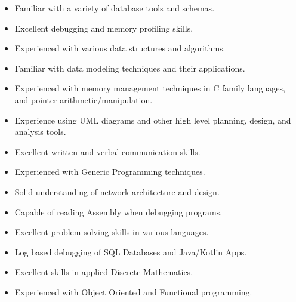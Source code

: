 \documentclass[9pt]{developercv}
\begin{document}
\begin{minipage}[t]{1\textwidth}
    \begin{minipage}[t]{.085\textwidth}
    \end{minipage}
    \hfill
     \begin{minipage}[t]{.4575\textwidth}
           \begin{itemize}[itemsep=2pt,topsep=0pt,parsep=0pt,partopsep=0pt,leftmargin=0pt]
            \item Familiar with a variety of database tools and schemas.
            \item Excellent debugging and memory profiling skills.
             \item Experienced with various data structures and algorithms.
            \item Familiar with data modeling techniques and their applications.

            \item Experienced with memory management techniques in C family languages, and pointer arithmetic/manipulation.
            \item Experience using UML diagrams and other high level planning, design, and analysis tools.
        \end{itemize}
    \end{minipage}
    \hfill
     \begin{minipage}[t]{.48\textwidth}
        \begin{itemize}[itemsep=2pt,topsep=0pt,parsep=0pt,partopsep=0pt,leftmargin=0pt]
            \item Excellent written and verbal communication skills.
            \item Experienced with Generic Programming techniques.
            \item Solid understanding of network architecture and design.
            \item Capable of reading Assembly when debugging programs.
            \item Excellent problem solving skills in various languages.
            \item Log based debugging of SQL Databases and Java/Kotlin Apps.
            \item Excellent skills in applied Discrete Mathematics.
            \item Experienced with Object Oriented and Functional programming.
        \end{itemize}
    \end{minipage}
\end{minipage}
\end{document}
